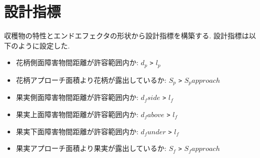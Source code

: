 \section{設計指標}
収穫物の特性とエンドエフェクタの形状から設計指標を構築する.
設計指標は以下のように設定した.

\begin{itemize}
  \item 花柄側面障害物間距離が許容範囲内か: $d_p$ \verb|>| $l_p$
  \item 花柄アプローチ面積より花柄が露出しているか: $S_p$ \verb|>| $S_papproach$
  \item 果実側面障害物間距離が許容範囲内か: $d_fside$ \verb|>| $l_f$
  \item 果実上面障害物間距離が許容範囲内か: $d_fabove$ \verb|>| $l_f$
  \item 果実下面障害物間距離が許容範囲内か: $d_funder$ \verb|>| $l_f$
  \item 果実アプローチ面積より果実が露出しているか: $S_f$ \verb|>| $S_fapproach$
\end{itemize}

